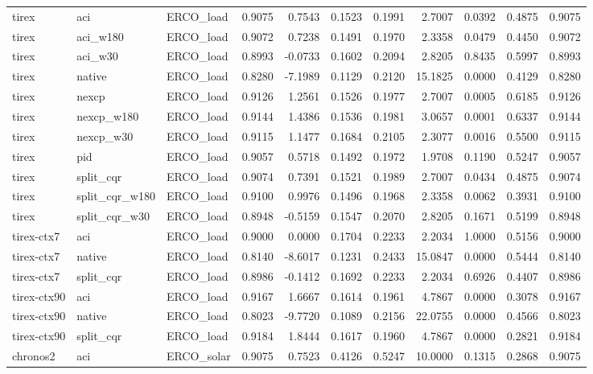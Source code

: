 \begin{tabular}{lllrrrrrrrr}
tirex & aci & ERCO_load & 0.9075 & 0.7543 & 0.1523 & 0.1991 & 2.7007 & 0.0392 & 0.4875 & 0.9075 \\
tirex & aci_w180 & ERCO_load & 0.9072 & 0.7238 & 0.1491 & 0.1970 & 2.3358 & 0.0479 & 0.4450 & 0.9072 \\
tirex & aci_w30 & ERCO_load & 0.8993 & -0.0733 & 0.1602 & 0.2094 & 2.8205 & 0.8435 & 0.5997 & 0.8993 \\
tirex & native & ERCO_load & 0.8280 & -7.1989 & 0.1129 & 0.2120 & 15.1825 & 0.0000 & 0.4129 & 0.8280 \\
tirex & nexcp & ERCO_load & 0.9126 & 1.2561 & 0.1526 & 0.1977 & 2.7007 & 0.0005 & 0.6185 & 0.9126 \\
tirex & nexcp_w180 & ERCO_load & 0.9144 & 1.4386 & 0.1536 & 0.1981 & 3.0657 & 0.0001 & 0.6337 & 0.9144 \\
tirex & nexcp_w30 & ERCO_load & 0.9115 & 1.1477 & 0.1684 & 0.2105 & 2.3077 & 0.0016 & 0.5500 & 0.9115 \\
tirex & pid & ERCO_load & 0.9057 & 0.5718 & 0.1492 & 0.1972 & 1.9708 & 0.1190 & 0.5247 & 0.9057 \\
tirex & split_cqr & ERCO_load & 0.9074 & 0.7391 & 0.1521 & 0.1989 & 2.7007 & 0.0434 & 0.4875 & 0.9074 \\
tirex & split_cqr_w180 & ERCO_load & 0.9100 & 0.9976 & 0.1496 & 0.1968 & 2.3358 & 0.0062 & 0.3931 & 0.9100 \\
tirex & split_cqr_w30 & ERCO_load & 0.8948 & -0.5159 & 0.1547 & 0.2070 & 2.8205 & 0.1671 & 0.5199 & 0.8948 \\
tirex-ctx7 & aci & ERCO_load & 0.9000 & 0.0000 & 0.1704 & 0.2233 & 2.2034 & 1.0000 & 0.5156 & 0.9000 \\
tirex-ctx7 & native & ERCO_load & 0.8140 & -8.6017 & 0.1231 & 0.2433 & 15.0847 & 0.0000 & 0.5444 & 0.8140 \\
tirex-ctx7 & split_cqr & ERCO_load & 0.8986 & -0.1412 & 0.1692 & 0.2233 & 2.2034 & 0.6926 & 0.4407 & 0.8986 \\
tirex-ctx90 & aci & ERCO_load & 0.9167 & 1.6667 & 0.1614 & 0.1961 & 4.7867 & 0.0000 & 0.3078 & 0.9167 \\
tirex-ctx90 & native & ERCO_load & 0.8023 & -9.7720 & 0.1089 & 0.2156 & 22.0755 & 0.0000 & 0.4566 & 0.8023 \\
tirex-ctx90 & split_cqr & ERCO_load & 0.9184 & 1.8444 & 0.1617 & 0.1960 & 4.7867 & 0.0000 & 0.2821 & 0.9184 \\
chronos2 & aci & ERCO_solar & 0.9075 & 0.7523 & 0.4126 & 0.5247 & 10.0000 & 0.1315 & 0.2868 & 0.9075 \\

\end{tabular}
